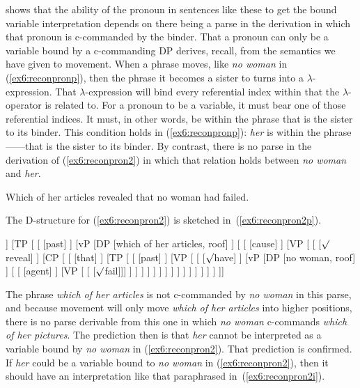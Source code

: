  shows that the ability of the pronoun in sentences like these to get the bound variable interpretation depends on there being a parse in the derivation in which that pronoun is c-commanded by the binder. That a pronoun can only be a variable bound by a c-commanding DP derives, recall, from the semantics we have given to movement. When a phrase moves, like \emph{no woman} in (\ref{ex6:reconpronp}), then the phrase it becomes a sister to turns into a $\lambda$-expression. That $\lambda$-expression will bind every referential index within that the $\lambda$-operator is related to. For a pronoun to be a variable, it must bear one of those referential indices. It must, in other words, be within the phrase that is the sister to its binder. This condition holds in (\ref{ex6:reconpronp}): \emph{her} is within the phrase------that is the sister to its binder. By contrast, there is no parse in the derivation of (\ref{ex6:reconpron2}) in which that relation holds between \emph{no woman} and \emph{her}.
\begin{exe}
\raggedright
	\ex \label{ex6:reconpron2}
	Which of her articles revealed that no woman had failed.
\end{exe}
The D-structure for (\ref{ex6:reconpron2}) is sketched in~(\ref{ex6:reconpron2p}).
\begin{exe}
\raggedright
\small
	\ex \label{ex6:reconpron2p}
	\footnotesize
	\begin{forest}
	[CP [\ibar{C}
		[\obar{C} [Q] ]
		[TP [
			[ [past] ]
			[vP
				[DP [which of her articles, roof] ]
				[
					[ [cause] ]
					[VP [
						[ [$\surd$reveal] ]
						[CP [
							[ [that] ]
							[TP [
								[ [past] ]
								[VP [
									[ [$\surd$have] ]
									[vP
										[DP [no woman, roof] ]
										[
											[ [agent] ]
											[VP [ [ [$\surd$fail]]] ]
										 ]
									 ]
								] ]
							] ]
						] ]
					] ]
				 ]
			 ]
		] ]
	]]
	\end{forest}
\end{exe}
The phrase \emph{which of her articles} is not c-commanded by \emph{no woman} in this parse, and because movement will only move \emph{which of her articles} into higher positions, there is no parse derivable from this one in which \emph{no woman} c-commands \emph{which of her pictures}. The prediction then is that \emph{her} cannot be interpreted as a variable bound by \emph{no woman} in (\ref{ex6:reconpron2}). That prediction is confirmed. If \emph{her} could be a variable bound to \emph{no woman} in (\ref{ex6:reconpron2}), then it should have an interpretation like that paraphrased in~(\ref{ex6:reconpron2i}).
